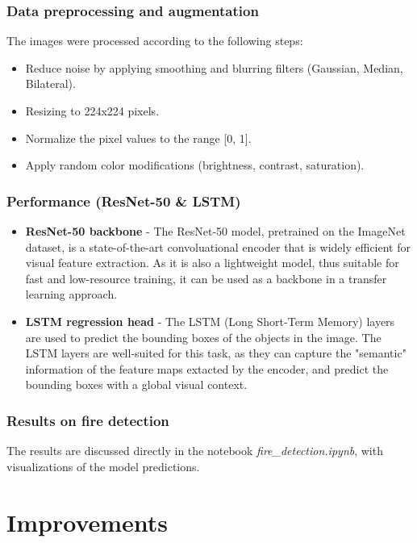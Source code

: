\documentclass{article}
\begin{document}
\subsubsection{Data preprocessing and augmentation}

The images were processed according to the following steps:

\begin{itemize}
    \item Reduce noise by applying smoothing and blurring filters (Gaussian, Median, Bilateral).
    \item Resizing to 224x224 pixels.
    \item Normalize the pixel values to the range [0, 1].
    \item Apply random color modifications (brightness, contrast, saturation).
\end{itemize}

\subsubsection{Performance (ResNet-50 \& LSTM)}

\begin{itemize}
    \item \textbf{ResNet-50 backbone} - The ResNet-50 model, pretrained on the ImageNet dataset, is a state-of-the-art convoluational encoder that is widely efficient for visual feature extraction. As it is also a lightweight model, thus suitable for fast and low-resource training, it can be used as a backbone in a transfer learning approach.
    \item \textbf{LSTM regression head} - The LSTM (Long Short-Term Memory) layers are used to predict the bounding boxes of the objects in the image. The LSTM layers are well-suited for this task, as they can capture the "semantic" information of the feature maps extacted by the encoder, and predict the bounding boxes with a global visual context.
\end{itemize}

\subsubsection{Results on fire detection}

The results are discussed directly in the notebook \textit{fire\_detection.ipynb}, with visualizations of the model predictions.

\newpage

\section{Improvements}
\end{document}
